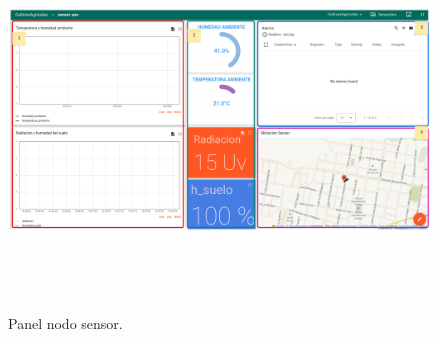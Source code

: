 \begin{figure}[h!]
  \centering
	\includegraphics[width=\textwidth, height=10cm]{./Figures/panel_nodosensor_editado.png}
  \caption{Panel nodo sensor.}
	\label{fig:Panel nodo sensor}
\end{figure}